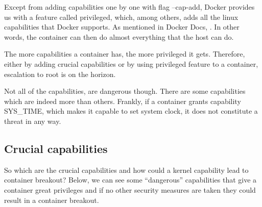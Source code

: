 Except from adding capabilities one by one with flag --cap-add, Docker provides us with a feature called privileged, which, among others, adds all the linux capabilities that Docker supports. 
As mentioned in Docker Docs, . In other words, the container can then do almost everything that the host can do.

The more capabilities a container has, the more privileged it gets. 
Therefore, either by adding crucial capabilities or by using privileged feature to a container, escalation to root is on the horizon.

Not all of the capabilities, are dangerous though. There are some capabilities which are indeed more  than others. Frankly, if a container grants capability SYS\_TIME, which makes it capable to set system clock, it does not constitute a threat in any way.

\subsection{Crucial capabilities}
So which are the crucial capabilities and how could a kernel capability lead to container breakout?
Below, we can see some “dangerous” capabilities that give a container great privileges and if no other security measures are taken they could result in a container breakout.

